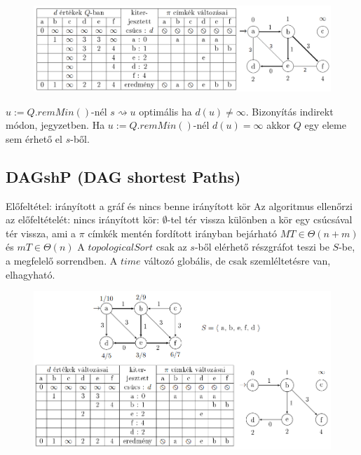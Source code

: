 \documentclass[12pt,a4paper]{article}
\renewcommand{\leadsto}{\rightsquigarrow}
\begin{document}
\begin{figure}[h!]
	\centering
	\includegraphics[width=1\linewidth]{dijkstra-példa}
\end{figure}

\begin{outline}
	\1 $u:=Q.remMin()$-nél $s \leadsto u$ optimális ha $d(u) \ne \infty$. Bizonyítás indirekt módon, jegyzetben.
	\1 Ha $u:=Q.remMin()$-nél $d(u) = \infty$ akkor $Q$ egy eleme sem érhető el $s$-ből.
\end{outline}

\pagebreak

\subsection{DAGshP (DAG shortest Paths)}

\begin{outline}
	\1 Előfeltétel: irányított a gráf és nincs benne irányított kör
	\1 Az algoritmus ellenőrzi az előfeltételét:
		\2 nincs irányított kör: $\emptyset$-tel tér vissza
		\2 különben a kör egy csúcsával tér vissza, ami a $\pi$ címkék mentén fordított irányban bejárható
	\1 $MT \in \Theta(n+m)$ és $mT \in \Theta(n)$
	\1 A $topologicalSort$ csak az $s$-ből elérhető részgráfot teszi be $S$-be, a megfelelő sorrendben.
	\1 A $time$ változó globális, de csak szemléltetésre van, elhagyható.
\end{outline}

\begin{figure}[h!]
	\centering
	\includegraphics[width=1\linewidth]{DAGshP-példa}
\end{figure}
\end{document}
